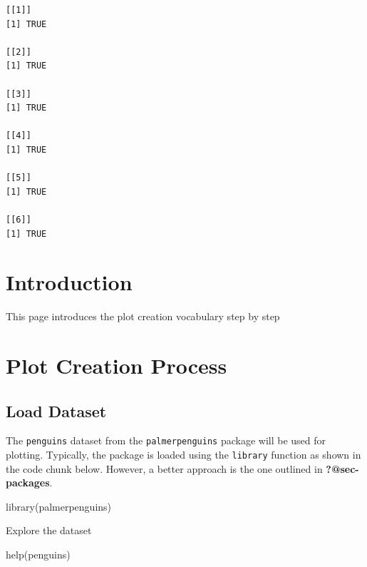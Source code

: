 \documentclass[
  letterpaper,
  DIV=11,
  numbers=noendperiod]{scrreprt}
\newenvironment{Shaded}{\begin{snugshade}}{\end{snugshade}}
\newcommand{\FunctionTok}[1]{\textcolor[rgb]{0.28,0.35,0.67}{#1}}
\newcommand{\NormalTok}[1]{\textcolor[rgb]{0.00,0.23,0.31}{#1}}
\begin{document}
\begin{verbatim}
[[1]]
[1] TRUE

[[2]]
[1] TRUE

[[3]]
[1] TRUE

[[4]]
[1] TRUE

[[5]]
[1] TRUE

[[6]]
[1] TRUE
\end{verbatim}

\section{Introduction}\label{introduction}

This page introduces the plot creation vocabulary step by step

\section{Plot Creation Process}\label{plot-creation-process}

\subsection{Load Dataset}\label{load-dataset}

The \texttt{penguins} dataset from the \texttt{palmerpenguins} package
will be used for plotting. Typically, the package is loaded using the
\texttt{library} function as shown in the code chunk below. However, a
better approach is the one outlined in \textbf{?@sec-packages}.

\begin{Shaded}
\begin{Highlighting}[]
\FunctionTok{library}\NormalTok{(palmerpenguins)}
\end{Highlighting}
\end{Shaded}

Explore the dataset

\begin{Shaded}
\begin{Highlighting}[]
\FunctionTok{help}\NormalTok{(penguins)}
\end{Highlighting}
\end{Shaded}
\end{document}
